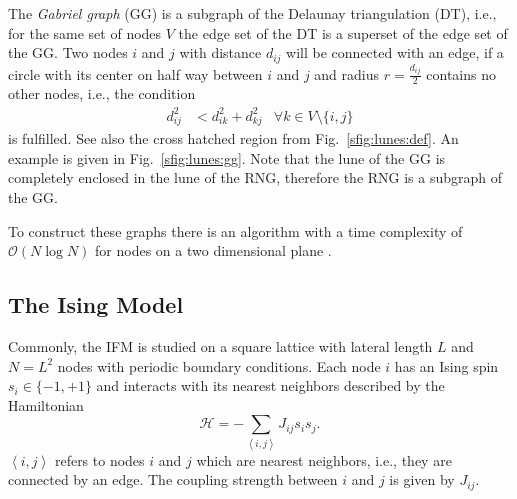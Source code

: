 \documentclass[pre,twocolumn,groupedaddress,showpacs,showkeys,amsmath,amssymb,floatfix]{revtex4-1}
\newcommand{\avg}[1]{\ensuremath{\left< #1 \right>}}
\begin{document}
            The \emph{Gabriel graph} (GG) \cite{Gabriel1969} is a subgraph
            of the Delaunay triangulation \cite{Delaunay1934,Katajainen}
            (DT), i.e., for the same set of nodes \(V\) the edge set of the
            DT is a superset of the edge set of the GG. Two nodes \(i\) and
            \(j\) with distance \(d_{ij}\) will be connected with an edge,
            if a circle with its center on half way between \(i\) and \(j\)
            and radius \(r = \frac{d_{ij}}{2}\) contains no other nodes, i.e., the
            condition
            \begin{align*}
                d^{2}_{ij} &< d^{2}_{ik} + d^{2}_{kj} &\forall k \in V\setminus\{i,j\}
            \end{align*}
            is fulfilled. See
            also the cross hatched region from Fig.~\ref{sfig:lunes:def}. An
            example is given in Fig.~\ref {sfig:lunes:gg}. Note that the
            lune of the GG is completely enclosed in the lune of the RNG,
            therefore the RNG is a subgraph of the GG.

            To construct these graphs there is an algorithm with
            a time complexity of \(\mathcal{O}(N \log N)\) for nodes on a two
            dimensional plane \cite{RNGCell}.

        \subsection{The Ising Model}
        \label{ssec:model}
            Commonly, the IFM is studied on a square lattice with lateral length
            \(L\) and \(N=L^2\) nodes with periodic boundary conditions.
            Each node $i$ has an Ising spin \(s_i \in \{-1,+1\}\) and interacts with its
            nearest neighbors described by the Hamiltonian
            \begin{equation}
                \mathcal{H} = - \sum_{\avg{i,j}}J_{ij}s_{i}s_{j}.
                \label{eq:hamiltonian}
            \end{equation}
            \(\avg{i,j}\) refers to nodes \(i\) and \(j\) which are
            nearest neighbors, i.e., they are connected by an edge.
            The coupling strength between \(i\) and \(j\) is given by
            \(J_{ij}\).
\end{document}
